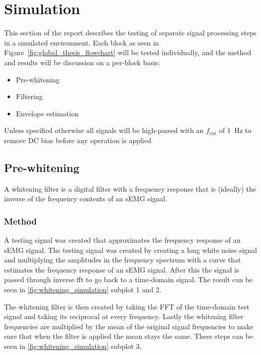 \chapter{Simulation}
This section of the report describes the testing of separate signal processing steps in a simulated environment. Each block as seen in Figure~\ref{fig:global_thesis_flowchart} will be tested individually, and the method and results will be discussion on a per-block basis:
\begin{itemize}
    \item Pre-whitening
    \item Filtering
    \item Envelope estimation
\end{itemize}

Unless specified otherwise all signals will be high-passed with an $f_\text{cut}$ of \SI{1}{\hertz} to remove DC bias before any operation is applied

\section{Pre-whitening}\label{sec:whitening}
A whitening filter is a digital filter with a frequency response that is (ideally) the inverse of the frequency contents of an sEMG signal. 

\subsection{Method}
A testing signal was created that approximates the frequency response of an sEMG signal. The testing signal was created by creating a long white noise signal and multiplying the amplitudes in the frequency spectrum with a curve that estimates the frequency response of an sEMG signal. After this the signal is passed through inverse fft to go back to a time-domain signal. The result can be seen in \ref{fig:whitening_simulation} subplot 1 and 2.

The whitening filter is then created by taking the FFT of the time-domain test signal and taking its reciprocal at every frequency. Lastly the whitening filter frequencies are multiplied by the mean of the original signal frequencies to make sure that when the filter is applied the mean stays the same. These steps can be seen in \ref{fig:whitening_simulation} subplot 3. 

